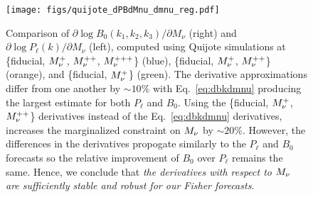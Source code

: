 \begin{figure}
\begin{center}
    \texttt{[image: figs/quijote\_dPBdMnu\_dmnu\_reg.pdf]} 
    \caption{Comparison of $\partial \log B_0(k_1, k_2, k_3)/\partial M_\nu$ (right) 
    and $\partial \log P_\ell(k)/\partial M_\nu$ (left), computed using Quijote simulations 
    at \{fiducial, $M_\nu^{+}$, $M_\nu^{++}$, $M_\nu^{+++}$\} (blue), 
    \{fiducial, $M_\nu^{+}$, $M_\nu^{++}$\} (orange), and \{fiducial, $M_\nu^{+}$\} 
    (green). The derivative approximations differ from one another by $\sim10\%$ with 
    Eq.~\ref{eq:dbkdmnu} producing the largest estimate for both $P_\ell$ and $B_0$.
    Using the \{fiducial, $M_\nu^{+}$, $M_\nu^{++}$\} derivatives instead of the 
    Eq.~\ref{eq:dbkdmnu} derivatives, increases the marginalized constraint on $M_\nu$ 
    by $\sim 20\%$. However, the differences in the derivatives propogate similarly to 
    the $P_\ell$ and $B_0$ forecasts so the relative improvement of $B_0$ over $P_\ell$
    remains the same. Hence, we conclude that {\em the derivatives with respect to $M_\nu$ 
    are sufficiently stable and robust for our Fisher forecasts}.
    }
\label{fig:dPBdmnu}
\end{center}
\end{figure}
